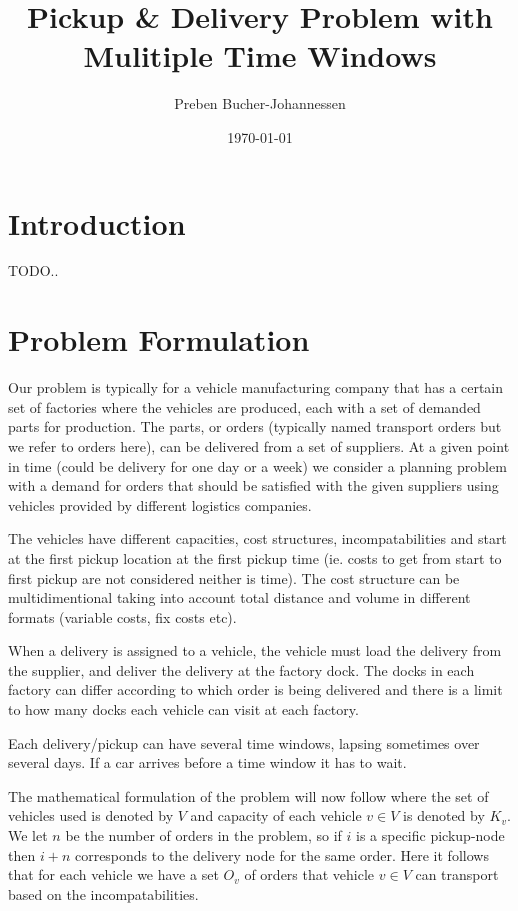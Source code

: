\documentclass[a4paper,12pt]{article}
\begin{document}
\title{Pickup \& Delivery Problem with Mulitiple Time Windows}
\author{Preben Bucher-Johannessen}
\date{\today}
\maketitle

\tableofcontents
\newpage
{}

\section{Introduction}
TODO..

\section{Problem Formulation} \label{sec:PForm}
Our problem is typically for a vehicle manufacturing company that has a certain set of factories where the vehicles are produced, each with a set of demanded parts for production. The parts, or orders (typically named transport orders but we refer to orders here), can be delivered from a set of suppliers. At a given point in time (could be delivery for one day or a week) we consider a planning problem with a demand for orders that should be satisfied with the given suppliers using vehicles provided by different logistics companies. \par 
The vehicles have different capacities, cost structures, incompatabilities and start at the first pickup location at the first pickup time (ie. costs to get from start to first pickup are not considered neither is time). The cost structure can be multidimentional taking into account total distance and volume in different formats (variable costs, fix costs etc). \par
When a delivery is assigned to a vehicle, the vehicle must load the delivery from the supplier, and deliver the delivery at the factory dock. The docks in each factory can differ according to which order is being delivered and there is a limit to how many docks each vehicle can visit at each factory. \par
Each delivery/pickup can have several time windows, lapsing sometimes over several days. If a car arrives before a time window it has to wait. \par
The mathematical formulation of the problem will now follow where the set of vehicles used is denoted by $V$ and capacity of each vehicle $v \in V$ is denoted by $K_v$. We let $n$ be the number of orders in the problem, so if $i$ is a specific pickup-node then $i+n$ corresponds to the delivery node for the same order. Here it follows that for each vehicle we have a set $O_v$ of orders that vehicle $v \in V$ can transport based on the incompatabilities. 
\end{document}
